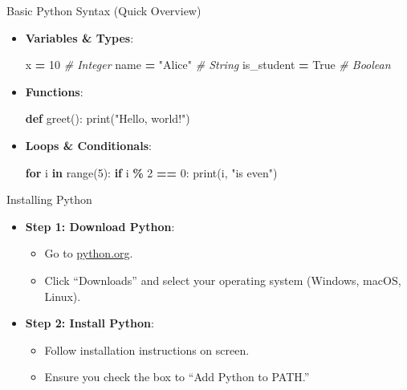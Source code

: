 \documentclass[
  ignorenonframetext,
]{beamer}
\newenvironment{Shaded}{\begin{snugshade}}{\end{snugshade}}
\newcommand{\BuiltInTok}[1]{#1}
\newcommand{\CommentTok}[1]{\textcolor[rgb]{0.56,0.35,0.01}{\textit{#1}}}
\newcommand{\ControlFlowTok}[1]{\textcolor[rgb]{0.13,0.29,0.53}{\textbf{#1}}}
\newcommand{\DecValTok}[1]{\textcolor[rgb]{0.00,0.00,0.81}{#1}}
\newcommand{\KeywordTok}[1]{\textcolor[rgb]{0.13,0.29,0.53}{\textbf{#1}}}
\newcommand{\NormalTok}[1]{#1}
\newcommand{\OperatorTok}[1]{\textcolor[rgb]{0.81,0.36,0.00}{\textbf{#1}}}
\newcommand{\StringTok}[1]{\textcolor[rgb]{0.31,0.60,0.02}{#1}}
\newcommand{\VariableTok}[1]{\textcolor[rgb]{0.00,0.00,0.00}{#1}}
\providecommand{\tightlist}{%
  \setlength{\itemsep}{0pt}\setlength{\parskip}{0pt}}
\begin{document}
\begin{frame}[fragile]{Basic Python Syntax (Quick Overview)}
\label{basic-python-syntax-quick-overview}
\begin{itemize}
\item
  \textbf{Variables \& Types}:

\begin{Shaded}
\begin{Highlighting}[]
\NormalTok{x }\OperatorTok{=} \DecValTok{10}  \CommentTok{\# Integer}
\NormalTok{name }\OperatorTok{=} \StringTok{"Alice"}  \CommentTok{\# String}
\NormalTok{is\_student }\OperatorTok{=} \VariableTok{True}  \CommentTok{\# Boolean}
\end{Highlighting}
\end{Shaded}
\item
  \textbf{Functions}:

\begin{Shaded}
\begin{Highlighting}[]
\KeywordTok{def}\NormalTok{ greet():}
    \BuiltInTok{print}\NormalTok{(}\StringTok{"Hello, world!"}\NormalTok{)}
\end{Highlighting}
\end{Shaded}
\item
  \textbf{Loops \& Conditionals}:

\begin{Shaded}
\begin{Highlighting}[]
\ControlFlowTok{for}\NormalTok{ i }\KeywordTok{in} \BuiltInTok{range}\NormalTok{(}\DecValTok{5}\NormalTok{):}
    \ControlFlowTok{if}\NormalTok{ i }\OperatorTok{\%} \DecValTok{2} \OperatorTok{==} \DecValTok{0}\NormalTok{:}
        \BuiltInTok{print}\NormalTok{(i, }\StringTok{"is even"}\NormalTok{)}
\end{Highlighting}
\end{Shaded}
\end{itemize}
\end{frame}

\begin{frame}{Installing Python}
\label{installing-python}
\begin{itemize}
\tightlist
\item
  \textbf{Step 1: Download Python}:

  \begin{itemize}
  \tightlist
  \item
    Go to \href{https://python.org}{python.org}.
  \item
    Click ``Downloads'' and select your operating system (Windows,
    macOS, Linux).
  \end{itemize}
\item
  \textbf{Step 2: Install Python}:

  \begin{itemize}
  \tightlist
  \item
    Follow installation instructions on screen.
  \item
    Ensure you check the box to ``Add Python to PATH.''
  \end{itemize}
\end{itemize}
\end{frame}
\end{document}
